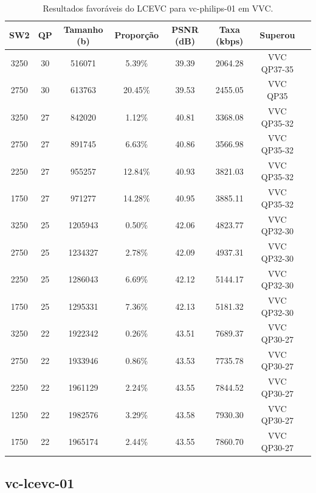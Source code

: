 \newpage
\begin{table}[h]
    \centering
    \label{tab:vc-philips-01-vvc-lcevc}
    \begin{tabular}{|c|c|c|c|c|c|c|c|}
        \hline
        \textbf{SW2} & \textbf{QP} & \textbf{Tamanho (b)} & \textbf{Proporção} & \textbf{PSNR (dB)} & \textbf{Taxa (kbps)} & \textbf{Superou} \\
        \hline
        3250 & 30 & 516071 & 5.39\% & 39.39 & 2064.28 & VVC QP37-35 \\
        2750 & 30 & 613763 & 20.45\% & 39.53 & 2455.05 & VVC QP35 \\
        3250 & 27 & 842020 & 1.12\% & 40.81 & 3368.08 & VVC QP35-32 \\
        2750 & 27 & 891745 & 6.63\% & 40.86 & 3566.98 & VVC QP35-32 \\
        2250 & 27 & 955257 & 12.84\% & 40.93 & 3821.03 & VVC QP35-32 \\
        1750 & 27 & 971277 & 14.28\% & 40.95 & 3885.11 & VVC QP35-32 \\
        3250 & 25 & 1205943 & 0.50\% & 42.06 & 4823.77 & VVC QP32-30 \\
        2750 & 25 & 1234327 & 2.78\% & 42.09 & 4937.31 & VVC QP32-30 \\
        2250 & 25 & 1286043 & 6.69\% & 42.12 & 5144.17 & VVC QP32-30 \\
        1750 & 25 & 1295331 & 7.36\% & 42.13 & 5181.32 & VVC QP32-30 \\
        3250 & 22 & 1922342 & 0.26\% & 43.51 & 7689.37 & VVC QP30-27 \\
        2750 & 22 & 1933946 & 0.86\% & 43.53 & 7735.78 & VVC QP30-27 \\
        2250 & 22 & 1961129 & 2.24\% & 43.55 & 7844.52 & VVC QP30-27 \\
        1250 & 22 & 1982576 & 3.29\% & 43.58 & 7930.30 & VVC QP30-27 \\
        1750 & 22 & 1965174 & 2.44\% & 43.55 & 7860.70 & VVC QP30-27 \\
        \hline
    \end{tabular}
    \caption{Resultados favoráveis do LCEVC para vc-philips-01 em VVC.}
\end{table}

\newpage
\subsection{vc-lcevc-01}

